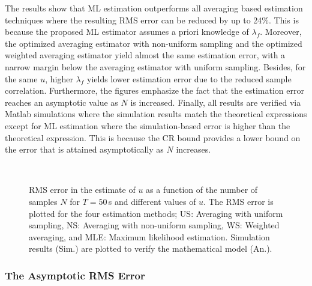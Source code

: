 \documentclass[11pt,draftclsnofoot,journal,onecolumn]{IEEEtran}
\begin{document}
The results show that ML estimation outperforms all averaging based estimation techniques where the resulting RMS error can be reduced by up to 24\%. This is because the proposed ML estimator assumes a priori knowledge of $\lambda_f$. Moreover, the optimized averaging estimator with non-uniform sampling and the optimized weighted averaging estimator yield almost the same estimation error, with a narrow margin below the averaging estimator with uniform sampling. Besides, for the same $u$, higher $\lambda_f$ yields lower estimation error due to the reduced sample correlation. Furthermore, the figures emphasize the fact that the estimation error reaches an asymptotic value as $N$ is increased. Finally, all results are verified via Matlab simulations where the simulation results match the theoretical expressions except for ML estimation where the simulation-based error is higher than the theoretical expression. This is because the CR bound provides a lower bound on the error that is attained asymptotically as $N$ increases.
\begin{figure}
\centering
{}\\
\caption{RMS error in the estimate of $u$ as a function of the number of samples $N$ for $T=50$\,s and different values of $u$. The RMS error is plotted for the four estimation methods; US: Averaging with uniform sampling, NS: Averaging with non-uniform sampling, WS: Weighted averaging, and MLE: Maximum likelihood estimation. Simulation results (Sim.) are plotted to verify the mathematical model (An.).}
\label{fig:rms_n}
\end{figure}

\subsubsection{The Asymptotic RMS Error}
\end{document}
